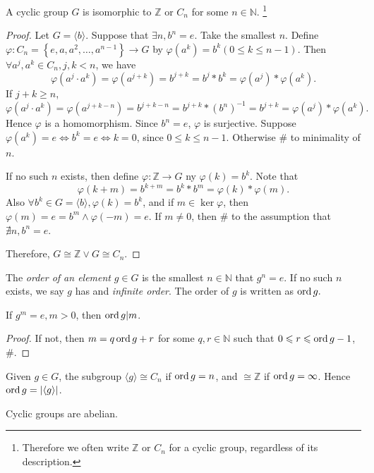 \documentclass[a4paper]{article}
\begin{document}
    \begin{theorem}\label{thm:cyclic group isom}
        A cyclic group $G$ is isomorphic to $ \mathbb{Z}  $ or $ C_n $ for some $ n\in \mathbb{N} $.
        \footnote{Therefore we often write $ \mathbb{Z}  $ or $ C_n $ for a cyclic group, regardless of its description.}
    \end{theorem}
    \begin{proof}
        Let $ G= \langle b \rangle  $. Suppose that $ \exists n, b^n=e $. Take the smallest $n$. Define $ \varphi: C_n = \left\{ e,a,a^2,\dots,a^{n-1}\right\}\to G $ by $ \varphi(a^k)=b^k(0\le k\le n-1) $. Then $ \forall a^j,a^k\in C_n, j,k<n $, we have 
        \[
            \varphi(a^j\cdot a^k)=\varphi(a^{j+k})=b^{j+k}= b^j*b^k=\varphi(a^j)*\varphi(a^k)
        .\]
        If $ j+k \ge n $, 
        \[
            \varphi(a^j\cdot a^k)=\varphi(a^{j+k-n})=b^{j+k-n}=b^{j+k}*(b^{n})^{-1}=b^{j+k}=\varphi(a^j)*\varphi(a^k)
        .\]
        Hence $ \varphi $ is a homomorphism. Since $ b^n=e $, $ \varphi $ is surjective. Suppose $ \varphi(a^k)=e \Leftrightarrow b^k=e \Leftrightarrow k=0 $, since $ 0\le k\le n-1 $. Otherwise \# to minimality of $n$.

        If no such $ n $ exists, then define $ \varphi: \mathbb{Z} \to G $ ny $ \varphi(k)=b^k $. Note that
        \[
            \varphi(k+m)=b^{k+m}=b^k*b^m=\varphi(k)*\varphi(m)
        .\]
        Also $ \forall b^k\in G=\langle b \rangle, \varphi(k)=b^k $, and if $ m\in \ker \varphi $, then $ \varphi(m)=e=b^m \land \varphi(-m)=e $. If $ m\neq 0 $, then \# to the assumption that $ \nexists n, b^n=e $.

        Therefore, $ G \cong \mathbb{Z} \lor G \cong C_n $.
    \end{proof}
    \begin{definition}
        The \textit{order of an element} $ g\in G $ is the smallest $ n\in \mathbb{N}  $ that $ g^n=e $. If no such $n$ exists, we say $g$ has and \textit{infinite order}. The order of $g$ is written as $ \operatorname{ord} g. $
    \end{definition}
    \begin{proposition}\label{prop:div_order}
        If $ g^m=e ,m>0$, then $ \operatorname{ord} g|m $.
    \end{proposition}
    \begin{proof}
        If not, then $ m=q\operatorname{ord} g +r$ for some $ q,r\in \mathbb{N}  $ such that $ 0\leqslant r\leqslant \operatorname{ord} g-1 $, \#.
    \end{proof}
    \begin{remark}
        Given $ g\in G $, the subgroup $ \langle g \rangle \cong C_n $ if $ \operatorname{ord} g=n $, and $ \cong \mathbb{Z}  $ if $ \operatorname{ord} g=\infty $. Hence $ \operatorname{ord} g=|\langle g \rangle | $. 
    \end{remark}
    \begin{proposition}\label{prop:cyclic_abelian}
        Cyclic groups are abelian.
    \end{proposition}
\end{document}
